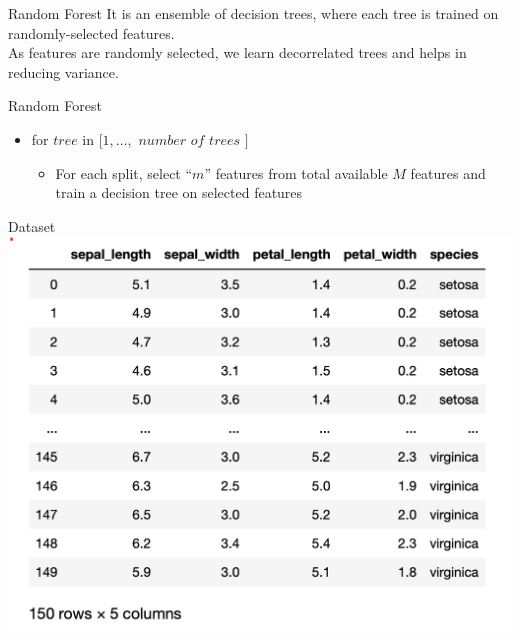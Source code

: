 \documentclass{beamer}
\begin{document}
	\begin{frame}{Random Forest}
		It is an ensemble of decision trees, where each tree is trained on randomly-selected features.\\
		\vspace{1cm}
		As features are randomly selected, we learn decorrelated trees and helps in reducing variance.\\
	\end{frame}

	\begin{frame}{Random Forest}

	\begin{itemize}
		\item for $tree$ in $[1, \dots,$ $number$ $of$ $trees$ $]$
		\begin{itemize}
			\item For each split, select ``$m$'' features from total available $M$ features and train a decision tree on selected features
			
		\end{itemize}
	\end{itemize}

\end{frame}


\begin{frame}{Dataset }
\includegraphics[scale=0.5]{dataset-iris.png}
\end{frame}
\end{document}
